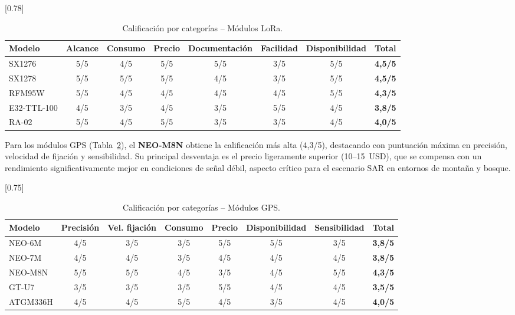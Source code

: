 \begin{table}[H]
\begin{center}
\caption{Calificación por categorías -- Módulos LoRa.}
\scalebox{0.78}[0.78]{
\begin{tabular}{| l | c | c | c | c | c | c | c |}
\hline
 \textbf{Modelo} & \textbf{Alcance} & \textbf{Consumo} & \textbf{Precio} & \textbf{Documentación} & \textbf{Facilidad} & \textbf{Disponibilidad} & \textbf{Total} \\
\hline
\hline
 SX1276 & 5/5 & 4/5 & 5/5 & 5/5 & 3/5 & 5/5 & \textbf{4,5/5} \\
 SX1278 & 5/5 & 5/5 & 5/5 & 4/5 & 3/5 & 5/5 & \textbf{4,5/5} \\
 RFM95W & 5/5 & 4/5 & 4/5 & 4/5 & 4/5 & 5/5 & \textbf{4,3/5} \\
 E32-TTL-100 & 4/5 & 3/5 & 4/5 & 3/5 & 5/5 & 4/5 & \textbf{3,8/5} \\
 RA-02 & 5/5 & 4/5 & 5/5 & 3/5 & 3/5 & 4/5 & \textbf{4,0/5} \\
\hline
\end{tabular}}
\label{tab:calificacion_lora}
\end{center}
\end{table}

Para los módulos GPS (Tabla~\ref{tab:calificacion_gps}), el \textbf{NEO-M8N} obtiene la calificación más alta (4,3/5), destacando con puntuación máxima en precisión, velocidad de fijación y sensibilidad. Su principal desventaja es el precio ligeramente superior (10--15~USD), que se compensa con un rendimiento significativamente mejor en condiciones de señal débil, aspecto crítico para el escenario SAR en entornos de montaña y bosque.

\begin{table}[H]
\begin{center}
\caption{Calificación por categorías -- Módulos GPS.}
\scalebox{0.75}[0.75]{
\begin{tabular}{| l | c | c | c | c | c | c | c |}
\hline
 \textbf{Modelo} & \textbf{Precisión} & \textbf{Vel. fijación} & \textbf{Consumo} & \textbf{Precio} & \textbf{Disponibilidad} & \textbf{Sensibilidad} & \textbf{Total} \\
\hline
\hline
 NEO-6M & 4/5 & 3/5 & 3/5 & 5/5 & 5/5 & 3/5 & \textbf{3,8/5} \\
 NEO-7M & 4/5 & 4/5 & 3/5 & 4/5 & 4/5 & 4/5 & \textbf{3,8/5} \\
 NEO-M8N & 5/5 & 5/5 & 4/5 & 3/5 & 4/5 & 5/5 & \textbf{4,3/5} \\
 GT-U7 & 3/5 & 3/5 & 3/5 & 5/5 & 4/5 & 4/5 & \textbf{3,5/5} \\
 ATGM336H & 4/5 & 4/5 & 5/5 & 4/5 & 3/5 & 4/5 & \textbf{4,0/5} \\
\hline
\end{tabular}}
\label{tab:calificacion_gps}
\end{center}
\end{table}

